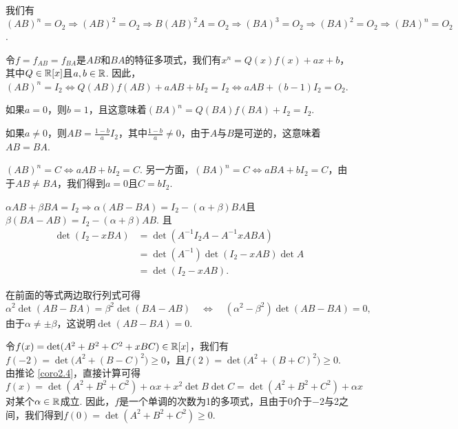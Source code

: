 \begin{solution}
  \begin{inparaenum}[(a)]
    \item 我们有$(AB)^n=O_2\Rightarrow (AB)^2=O_2\Rightarrow B(AB)^2A=O_2\Rightarrow(BA)^3=O_2
        \Rightarrow(BA)^2=O_2\Rightarrow(BA)^n=O_2$.

    \item 令$f=f_{AB}=f_{BA}$是$AB$和$BA$的特征多项式，我们有$x^n=Q(x)f(x)+ax+b$，其中$Q\in\mathbb R[x]$且$a,b\in\mathbb R$. 因此，$(AB)^n=I_2\Leftrightarrow Q(AB)f(AB)+aAB+bI_2=I_2\Leftrightarrow
        aAB+(b-1)I_2=O_2$.

        如果$a=0$，则$b=1$，且这意味着$(BA)^n=Q(BA)f(BA)+I_2=I_2$.

        如果$a\ne0$，则$AB=\frac{1-b}aI_2$，其中$\frac{1-b}a\ne0$，由于$A$与$B$是可逆的，这意味着$AB=BA$.

        \item $(AB)^n=C\Leftrightarrow aAB+bI_2=C$. 另一方面，$(BA)^n=C\Leftrightarrow aBA+bI_2=C$，由于$AB\ne BA$，我们得到$a=0$且$C=bI_2$.
  \end{inparaenum}
\end{solution}

\begin{solution}
  $\alpha AB+\beta BA=I_2\Rightarrow \alpha(AB-BA)=I_2-(\alpha+\beta)BA$且$\beta(BA-AB)=I_2
  -(\alpha+\beta)AB$. 且
  \begin{align*}
    \det(I_2 - xBA) & = \det (A^{-1}I_2A - A^{-1}xABA) \\
    & = \det(A^{-1}) \det (I_2 - xAB) \det A\\
    & = \det (I_2 - xAB).
  \end{align*}

  在前面的等式两边取行列式可得
  \[
    \alpha^2 \det(AB - BA) = \beta^2 \det(BA - AB)\quad \Leftrightarrow \quad
    (\alpha^2 - \beta^2)\det(AB - BA) = 0,
  \]
  由于$\alpha\ne\pm\beta$，这说明$\det(AB-BA)=0$.
\end{solution}

\begin{solution}
  令$f(x)=\det(A^2+B^2+C^2+xBC)\in\mathbb R[x]$，我们有$f(-2)=\det\big(A^2+(B-C)^2\big)\ge0$，且$f(2)=
  \det\big(A^2+(B+C)^2\big)\ge0 $. 由推论 \ref{coro2.4}，直接计算可得
  \[
    f(x) = \det(A^2 + B^2 + C^2) + \alpha x + x^2 \det B\det C = \det(A^2 + B^2 + C^2) + \alpha x
  \]
  对某个$\alpha\in\mathbb R$成立. 因此，$f$是一个单调的次数为1的多项式，且由于0介于$-2$与2之间，我们得到$f(0)=\det(A^2 + B^2 + C^2)\ge0$.
\end{solution}

